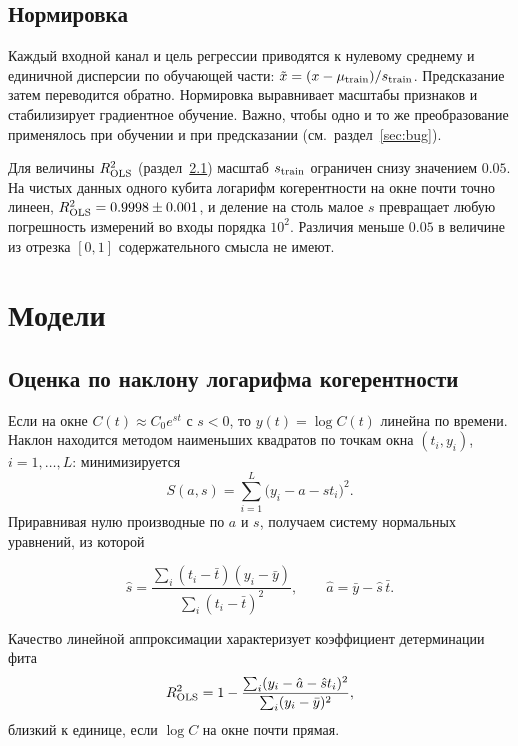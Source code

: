 \documentclass[12pt,a4paper]{report}
\numberwithin{equation}{chapter}
\begin{document}
\section{Нормировка}

Каждый входной канал и цель регрессии приводятся к нулевому среднему и
единичной дисперсии по обучающей части:
$\tilde x=(x-\mu_{\rm train})/s_{\rm train}$. Предсказание затем переводится
обратно. Нормировка выравнивает масштабы признаков и стабилизирует
градиентное обучение. Важно, чтобы одно и то же преобразование применялось
при обучении и при предсказании (см.\ раздел~\ref{sec:bug}).

Для величины $R^2_{\rm OLS}$ (раздел~\ref{sec:ols}) масштаб $s_{\rm train}$
ограничен снизу значением $0.05$. На чистых данных одного кубита логарифм
когерентности на окне почти точно линеен, $R^2_{\rm OLS}=0.9998\pm0.001$, и
деление на столь малое $s$ превращает любую погрешность измерений во входы
порядка $10^2$. Различия меньше $0.05$ в величине из отрезка $[0,1]$
содержательного смысла не имеют.

\chapter{Модели}
\label{chap:models}

\section{Оценка по наклону логарифма когерентности}
\label{sec:ols}

Если на окне $C(t)\approx C_0e^{st}$ с $s<0$, то $y(t)=\log C(t)$ линейна по
времени. Наклон находится методом наименьших квадратов по точкам окна
$(t_i,y_i)$, $i=1,\dots,L$: минимизируется
\begin{equation}
S(a,s)=\sum_{i=1}^L\bigl(y_i-a-st_i\bigr)^2 .
\end{equation}
Приравнивая нулю производные по $a$ и $s$, получаем систему нормальных
уравнений, из которой
\begin{keybox}
\begin{equation}
\hat s=\frac{\sum_i(t_i-\bar t)(y_i-\bar y)}{\sum_i(t_i-\bar t)^2},\qquad
\hat a=\bar y-\hat s\,\bar t .
\label{eq:slope}
\end{equation}
\end{keybox}
Качество линейной аппроксимации характеризует коэффициент детерминации фита
\begin{equation}
R^2_{\rm OLS}=1-\frac{\sum_i(y_i-\hat a-\hat st_i)^2}{\sum_i(y_i-\bar y)^2},
\end{equation}
близкий к единице, если $\log C$ на окне почти прямая.
\end{document}
